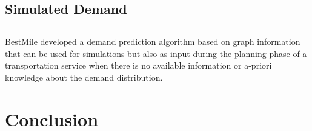 \documentclass[12pt,a4paper]{article}
\begin{document}
\subsection{Simulated Demand}
\subsection{}
BestMile developed a demand prediction algorithm based on graph information that can be used for simulations but also as input during the planning phase of a transportation service when there is no available information or a-priori knowledge about the demand distribution. 
\section{Conclusion}



\end{document}
